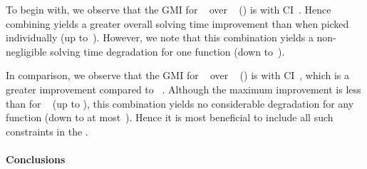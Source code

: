 To begin with, we observe that the \gls{GMI} for ~ over ~
() is \printGMI{%
  \SolvTechEnableOnlyGoodImpliedConsPrePlusSolvingTimeSpeedupPrePlusSolvingTimeRegularSpeedupGmean%
} with \gls{CI}~\printGMICI{%
  \SolvTechEnableOnlyGoodImpliedConsPrePlusSolvingTimeSpeedupPrePlusSolvingTimeRegularSpeedupCiMin%
}{%
  \SolvTechEnableOnlyGoodImpliedConsPrePlusSolvingTimeSpeedupPrePlusSolvingTimeRegularSpeedupCiMax%
}.
%
Hence combining  yields a greater overall solving time
improvement than when picked individually (up
to~\printZCNorm{%
  \SolvTechEnableOnlyGoodImpliedConsPrePlusSolvingTimeSpeedupPrePlusSolvingTimeZeroCenteredSpeedupMax%
}).
%
However, we note that this combination yields a non-negligible solving time
degradation for one \gls{function} (down
to~\printZCNorm{%
  \SolvTechEnableOnlyGoodImpliedConsPrePlusSolvingTimeSpeedupPrePlusSolvingTimeZeroCenteredSpeedupMin%
}).

In comparison, we observe that the \gls{GMI} for ~ over ~
() is \printGMI{%
  \SolvTechDisableAllImpliedConsPrePlusSolvingTimeSpeedupPrePlusSolvingTimeRegularSpeedupGmean%
} with \gls{CI}~\printGMICI{%
  \SolvTechDisableAllImpliedConsPrePlusSolvingTimeSpeedupPrePlusSolvingTimeRegularSpeedupCiMin%
}{%
  \SolvTechDisableAllImpliedConsPrePlusSolvingTimeSpeedupPrePlusSolvingTimeRegularSpeedupCiMax%
}, which is a greater improvement compared to ~.
%
Although the maximum improvement is less than for ~ (up to
\printZCNorm{%
  \SolvTechDisableAllImpliedConsPrePlusSolvingTimeSpeedupPrePlusSolvingTimeZeroCenteredSpeedupMax%
}), this combination yields no considerable degradation for any \gls{function}
(down to at
most~\printZCNorm{%
  \SolvTechDisableAllImpliedConsPrePlusSolvingTimeSpeedupPrePlusSolvingTimeZeroCenteredSpeedupMin%
}).
%
Hence it is most beneficial to include all such \glspl{constraint} in the
.


\paragraph{Conclusions}

